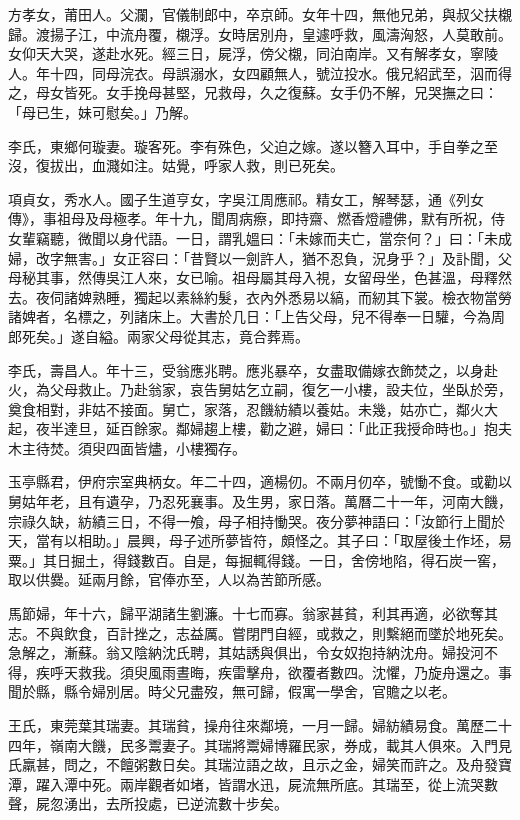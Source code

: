 \begin{pinyinscope}
方孝女，莆田人。父瀾，官儀制郎中，卒京師。女年十四，無他兄弟，與叔父扶櫬歸。渡揚子江，中流舟覆，櫬浮。女時居別舟，皇遽呼救，風濤洶怒，人莫敢前。女仰天大哭，遂赴水死。經三日，屍浮，傍父櫬，同泊南岸。又有解孝女，寧陵人。年十四，同母浣衣。母誤溺水，女四顧無人，號泣投水。俄兄紹武至，泅而得之，母女皆死。女手挽母甚堅，兄救母，久之復蘇。女手仍不解，兄哭撫之曰：「母已生，妹可慰矣。」乃解。

李氏，東鄉何璇妻。璇客死。李有殊色，父迫之嫁。遂以簪入耳中，手自拳之至沒，復拔出，血濺如注。姑覺，呼家人救，則已死矣。

項貞女，秀水人。國子生道亨女，字吳江周應祁。精女工，解琴瑟，通《列女傳》，事祖母及母極孝。年十九，聞周病瘵，即持齋、燃香燈禮佛，默有所祝，侍女輩竊聽，微聞以身代語。一日，謂乳媼曰：「未嫁而夫亡，當奈何？」曰：「未成婦，改字無害。」女正容曰：「昔賢以一劍許人，猶不忍負，況身乎？」及訃聞，父母秘其事，然傳吳江人來，女已喻。祖母屬其母入視，女留母坐，色甚溫，母釋然去。夜伺諸婢熟睡，獨起以素絲約髮，衣內外悉易以縞，而紉其下裳。檢衣物當勞諸婢者，名標之，列諸床上。大書於几日：「上告父母，兒不得奉一日驩，今為周郎死矣。」遂自縊。兩家父母從其志，竟合葬焉。

李氏，壽昌人。年十三，受翁應兆聘。應兆暴卒，女盡取備嫁衣飾焚之，以身赴火，為父母救止。乃赴翁家，哀告舅姑乞立嗣，復乞一小樓，設夫位，坐臥於旁，奠食相對，非姑不接面。舅亡，家落，忍饑紡績以養姑。未幾，姑亦亡，鄰火大起，夜半達旦，延百餘家。鄰婦趨上樓，勸之避，婦曰：「此正我授命時也。」抱夫木主待焚。須臾四面皆燼，小樓獨存。

玉亭縣君，伊府宗室典柄女。年二十四，適楊仞。不兩月仞卒，號慟不食。或勸以舅姑年老，且有遺孕，乃忍死襄事。及生男，家日落。萬曆二十一年，河南大饑，宗祿久缺，紡績三日，不得一飧，母子相持慟哭。夜分夢神語曰：「汝節行上聞於天，當有以相助。」晨興，母子述所夢皆符，頗怪之。其子曰：「取屋後土作坯，易粟。」其日掘土，得錢數百。自是，每掘輒得錢。一日，舍傍地陷，得石炭一窖，取以供爨。延兩月餘，官俸亦至，人以為苦節所感。

馬節婦，年十六，歸平湖諸生劉濂。十七而寡。翁家甚貧，利其再適，必欲奪其志。不與飲食，百計挫之，志益厲。嘗閉門自經，或救之，則繫絕而墜於地死矣。急解之，漸蘇。翁又陰納沈氏聘，其姑誘與俱出，令女奴抱持納沈舟。婦投河不得，疾呼天救我。須臾風雨晝晦，疾雷擊舟，欲覆者數四。沈懼，乃旋舟還之。事聞於縣，縣令婦別居。時父兄盡歿，無可歸，假寓一學舍，官贍之以老。

王氏，東莞葉其瑞妻。其瑞貧，操舟往來鄰境，一月一歸。婦紡績易食。萬歷二十四年，嶺南大饑，民多鬻妻子。其瑞將鬻婦博羅民家，券成，載其人俱來。入門見氏羸甚，問之，不饘粥數日矣。其瑞泣語之故，且示之金，婦笑而許之。及舟發寶潭，躍入潭中死。兩岸觀者如堵，皆謂水迅，屍流無所底。其瑞至，從上流哭數聲，屍忽湧出，去所投處，已逆流數十步矣。


\end{pinyinscope}

